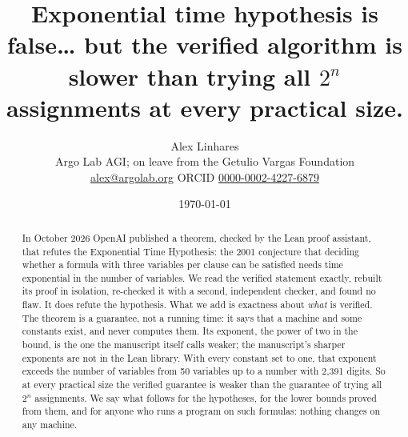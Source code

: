 \documentclass[11pt,letterpaper]{article}
\title{Exponential time hypothesis is false\ldots{} but the verified algorithm is slower than trying all $2^n$ assignments at every practical size.}
\author{Alex Linhares\\{\small Argo Lab AGI; on leave from the Getulio Vargas Foundation}\\{\small \href{mailto:alex@argolab.org}{alex@argolab.org} \quad ORCID \href{https://orcid.org/0000-0002-4227-6879}{0000-0002-4227-6879}}}
\date{\today}
\numberwithin{figure}{section}
\numberwithin{table}{section}
\theoremstyle{plain}
\theoremstyle{definition}
\theoremstyle{remark}
\begin{document}
\maketitle

\begin{abstract}
\noindent
In October 2026 OpenAI published a theorem, checked by the Lean proof
assistant, that refutes the Exponential Time Hypothesis: the 2001
conjecture that deciding whether a formula with three variables per
clause can be satisfied needs time exponential in the number of
variables. We read the verified statement exactly, rebuilt its proof in
isolation, re-checked it with a second, independent checker, and found
no flaw. It does refute the hypothesis. What we add is exactness about
\emph{what} is verified. The theorem is a guarantee, not a running time:
it says that a machine and some constants exist, and never computes
them. Its exponent, the power of two in the bound, is the one the
manuscript itself calls weaker; the manuscript's sharper exponents are
not in the Lean library. With every constant set to one, that exponent
exceeds the number of variables from 50 variables up to a number with
2,391 digits. So at every practical size the verified guarantee is
weaker than the guarantee of trying all $2^n$ assignments. We say what
follows for the hypotheses, for the lower bounds proved from them, and
for anyone who runs a program on such formulas: nothing changes on any
machine.
\end{abstract}
















\begin{appendices}


\end{appendices}
\end{document}
